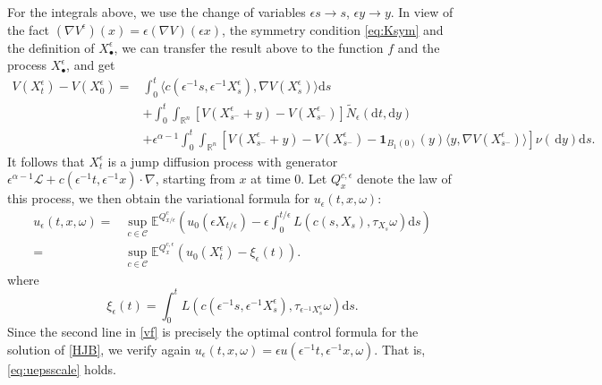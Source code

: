 \documentclass[11pt,reqno]{amsart}
\theoremstyle{definition}
\theoremstyle{remark}
\numberwithin{equation}{section}
\newcommand{\eps}{\epsilon}
\begin{document}
For the integrals above, we use the change of variables $\eps s \to s$, $\eps y \to y$. In view of the fact $(\nabla V^\eps)(x) = \eps (\nabla V)(\eps x)$, the symmetry condition \eqref{eq:Ksym} and the definition of $X^\eps_\bullet$, we can transfer the result above to the function $f$ and the process $X^\eps_\bullet$, and get
    \begin{equation}
    \label{eq:rescaledIto}
    \begin{aligned}
  V(X^\eps_t) -V(X_0^\eps)  =& \int_{0}^{ t} \langle 
    c(\epsilon^{-1}s,\epsilon^{-1}X^{\epsilon}_{s}), \nabla V(X^{\epsilon}_{s})\rangle \mathrm{d}s \\
    & + \int_{0}^{t} \int_{\mathbb{R}^n} [V(X^{\epsilon}_{s^{-}}+ y)-V(X^{\epsilon}_{s^{-}})]\widetilde{N}_{\epsilon}(\mathrm{d}t,\mathrm{d}y)\\
    & + \epsilon^{\alpha-1 }\int_{0}^{t} \int_{\mathbb{R}^n}[V(X^{\epsilon}_{s^{-}}+y)-V(X^{\epsilon}_{s^{-}}) -\mathbf{1}_{B_{1}(0)}(y)\langle y, \nabla V(X^{\epsilon}_{s^{-}}) \rangle ]\nu(\,\mathrm{d}y)\mathrm{d}s.
\end{aligned}
\end{equation}
It follows that $X^{\epsilon}_{t}$ is a jump diffusion process with generator $\epsilon^{\alpha-1} \mathscr{L} + c(\epsilon^{-1}t, \epsilon^{-1}x)\cdot\nabla$, starting from $x$ at time $0$. Let $Q^{c,\epsilon}_{x}$ denote the law of this process, we then obtain the variational formula for $u_{\epsilon}(t,x,\omega)$:
\begin{equation}
\label{vf}
\begin{aligned}
    u_{\epsilon}(t,x,\omega) = & \sup_{c\in\mathscr{C}} \mathbb{E}^{Q^{c}_{x/\epsilon}}\left( u_{0}(\epsilon X_{t/\epsilon}) - \epsilon\int^{t/\epsilon}_0 L(c(s,X_s),\tau_{X_{s}}\omega)\mathrm{d}s \right)\\
    = & \sup_{c\in\mathscr{C}} \mathbb{E}^{Q^{c,\epsilon}_{x}}\left( u_{0}(X^{\epsilon}_{t}) - \xi_{\epsilon}(t) \right).
\end{aligned}
\end{equation}
where 
\begin{equation}
\label{eq:xiepsdef}
    \xi_{\epsilon}(t) %
    = \int^{t}_0 L(c(\epsilon^{-1}s, \epsilon^{-1}X^{\epsilon}_s),\tau_{\epsilon^{-1}X^{\epsilon}_{s}}\omega)\mathrm{d}s.
\end{equation}
Since the second line in \eqref{vf} is precisely the optimal control formula for the solution of \eqref{HJB}, we verify again $u_\eps(t,x,\omega)=\eps u(\eps^{-1}t,\eps^{-1}x,\omega)$. That is, \eqref{eq:uepsscale} holds.
\end{document}
